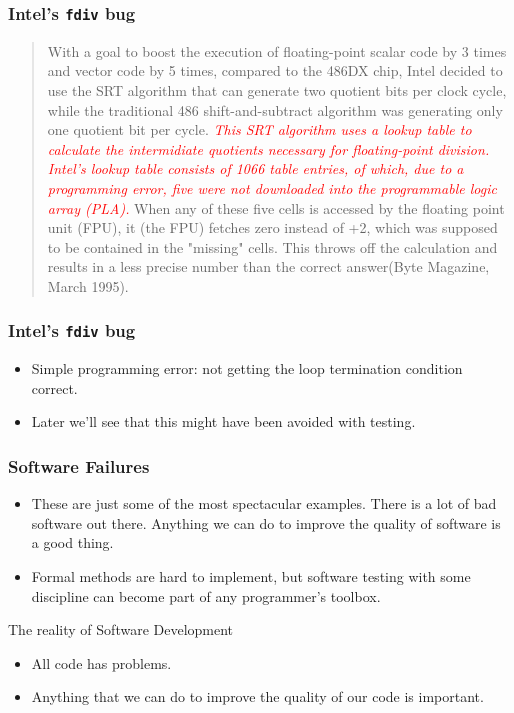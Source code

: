 \documentclass[handout]{beamer}
\begin{document}
\begin{frame}
  \frametitle{Intel's {\tt fdiv} bug}
  \begin{quote}
    With a goal to boost the execution of floating-point scalar code by 3
    times and vector code by 5 times, compared to the 486DX chip, Intel
    decided to use the SRT algorithm that can generate two quotient bits per
    clock cycle, while the traditional 486 shift-and-subtract algorithm was
    generating only one quotient bit per cycle. \textcolor{red}{\em This SRT
      algorithm uses a lookup table to calculate the intermidiate quotients
      necessary for floating-point division. Intel's lookup table consists of
      1066 table entries, of which, due to a programming error, five were not
      downloaded into the programmable logic array (PLA).} When any of these
    five cells is accessed by the floating point unit (FPU), it (the FPU)
    fetches zero instead of +2, which was supposed to be contained in the
    "missing" cells. This throws off the calculation and results in a less
    precise number than the correct answer(Byte Magazine, March 1995).
  \end{quote}
\end{frame}
\begin{frame}
  \frametitle{Intel's {\tt fdiv} bug}
  \begin{itemize}
  \item Simple programming error: not getting the loop termination
    condition correct.
  \item Later we'll see that this might have been avoided with testing.
  \end{itemize}
\end{frame}
\begin{frame}
  \frametitle{Software Failures}
  \begin{itemize}
  \item These are just some of the most spectacular examples. There is
    a lot of bad software out there. Anything we can do to
    improve the quality of software is a good thing. 
  \item  Formal methods are hard to implement, but
    software testing with some discipline can become part of any
    programmer's toolbox.
  \end{itemize}
\end{frame}

\begin{frame}{The reality of Software Development}
  \begin{itemize}
  \item All code has problems.
  \item Anything that we can do to improve the quality of our code is
    important.
    
  \end{itemize}
  
\end{frame}
\end{document}
